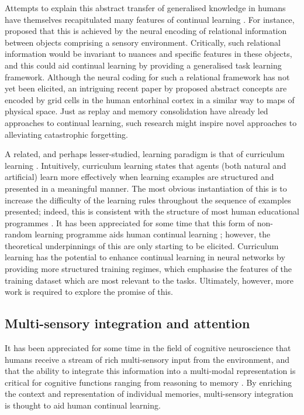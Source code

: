 \documentclass{article} %
\begin{document}
Attempts to explain this abstract transfer of generalised knowledge in humans have themselves recapitulated many features of continual learning \citep{doumas2008theory,barnett2002and,pan2009survey,holyoak1997analogical}. For instance, \citet{doumas2008theory} proposed that this is achieved by the neural encoding of relational information between objects comprising a sensory environment. Critically, such relational information would be invariant to nuances and specific features in these objects, and this could aid continual learning by providing a generalised task learning framework. Although the neural coding for such a relational framework has not yet been elicited, an intriguing recent paper by \citet{constantinescu2016organizing} proposed abstract concepts are encoded by grid cells in the human entorhinal cortex in a similar way to maps of physical space. Just as replay and memory consolidation have already led approaches to continual learning, such research might inspire novel approaches to alleviating catastrophic forgetting.

A related, and perhaps lesser-studied, learning paradigm is that of curriculum learning \citep{bengio2009curriculum,elman1993learning}. Intuitively, curriculum learning states that agents (both natural and artificial) learn more effectively when learning examples are structured and presented in a meaningful manner. The most obvious instantiation of this is to increase the difficulty of the learning rules throughout the sequence of examples presented; indeed, this is consistent with the structure of most human educational programmes \citep{krueger2009flexible,goldman1995complexity}. It has been appreciated for some time that this form of non-random learning programme aids human continual learning \citep{elman1993learning,krueger2009flexible}; however, the theoretical underpinnings of this are only starting to be elicited. Curriculum learning has the potential to enhance continual learning in neural networks by providing more structured training regimes, which emphasise the features of the training dataset which are most relevant to the tasks. Ultimately, however, more work is required to explore the promise of this.

\subsection*{Multi-sensory integration and attention}

It has been appreciated for some time in the field of cognitive neuroscience that humans receive a stream of rich multi-sensory input from the environment, and that the ability to integrate this information into a multi-modal representation is critical for cognitive functions ranging from reasoning to memory \citep{spence2010crossmodal,spence2014orienting,stein1993merging,stein2014development}. By enriching the context and representation of individual memories, multi-sensory integration is thought to aid human continual learning.
\end{document}
